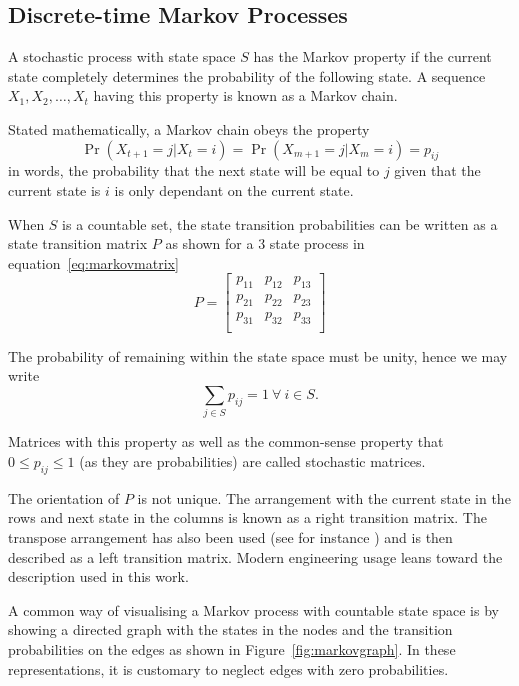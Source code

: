 \subsection{Discrete-time Markov Processes}
A stochastic process with state space $S$ has the Markov
property if the current state completely determines the probability of
the following state.  A sequence $X_1,X_2, \dots ,X_t$ having this
property is known as a Markov chain.

Stated mathematically, a Markov chain obeys the property
\begin{equation}
  \label{eq:markovproperty}
  \Pr(X_{t+1} = j|X_{t}=i) = \Pr(X_{m+1}=j|X_{m}=i)=p_{ij}
\end{equation}
in words, the probability that the next state will be equal to $j$ given
that the current state is $i$ is only dependant on the current state.

When $S$ is a countable set, the state transition probabilities can be written 
as a state transition matrix $P$ as shown for a 3 state process in
equation~\ref{eq:markovmatrix}
\begin{equation}
\label{eq:markovmatrix}
P = \left[ 
  \begin{array}{cccc}
    p_{11} & p_{12} & p_{13}\\
    p_{21} & p_{22} & p_{23}\\
    p_{31} & p_{32} & p_{33}\\
  \end{array} \right ]
\end{equation}

The probability of remaining within the state space must be unity,
hence we may write 
\begin{equation}
  \label{eq:rowsumone}
  \sum_{j\in S} p_{ij}=1~\forall~i \in S.
\end{equation}

Matrices with this property as well as the common-sense property
that $0 \leq p_{ij} \leq 1$ (as they are probabilities) are called
stochastic matrices.

The orientation of $P$ is not unique. The arrangement with the current
state in the rows and next state in the columns is known as a right
transition matrix. The transpose arrangement has also been used (see
for instance \citet{bhar.hamori2004hidden}) and is then described as a left
transition matrix. Modern engineering usage leans toward the
description used in this work.

A common way of visualising a Markov process with countable state
space is by showing a directed graph with the states in the nodes and
the transition probabilities on the edges as shown in
Figure~\ref{fig:markovgraph}. In these representations, it is
customary to neglect edges with zero probabilities.

